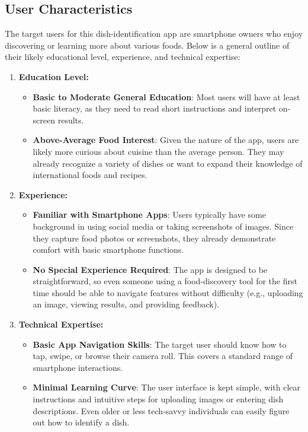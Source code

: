 \documentclass[]{article}
\begin{document}
\subsection{User Characteristics}
\label{sub:user_characteristics}

The target users for this dish-identification app are smartphone owners who enjoy discovering or learning more about various foods. Below is a general outline of their likely educational level, experience, and technical expertise:

\begin{enumerate}
    \item \textbf{Education Level:}
    \begin{itemize}
        \item \textbf{Basic to Moderate General Education}: Most users will have at least basic literacy, as they need to read short instructions and interpret on-screen results.
        \item \textbf{Above-Average Food Interest}: Given the nature of the app, users are likely more curious about cuisine than the average person. They may already recognize a variety of dishes or want to expand their knowledge of international foods and recipes.
    \end{itemize}
    
    \item \textbf{Experience:}
    \begin{itemize}
        \item \textbf{Familiar with Smartphone Apps}: Users typically have some background in using social media or taking screenshots of images. Since they capture food photos or screenshots, they already demonstrate comfort with basic smartphone functions.
        \item \textbf{No Special Experience Required}: The app is designed to be straightforward, so even someone using a food-discovery tool for the first time should be able to navigate features without difficulty (e.g., uploading an image, viewing results, and providing feedback).
    \end{itemize}
    
    \item \textbf{Technical Expertise:}
    \begin{itemize}
        \item \textbf{Basic App Navigation Skills}: The target user should know how to tap, swipe, or browse their camera roll. This covers a standard range of smartphone interactions.
        \item \textbf{Minimal Learning Curve}: The user interface is kept simple, with clear instructions and intuitive steps for uploading images or entering dish descriptions. Even older or less tech-savvy individuals can easily figure out how to identify a dish.
    \end{itemize}
\end{enumerate}
\end{document}
